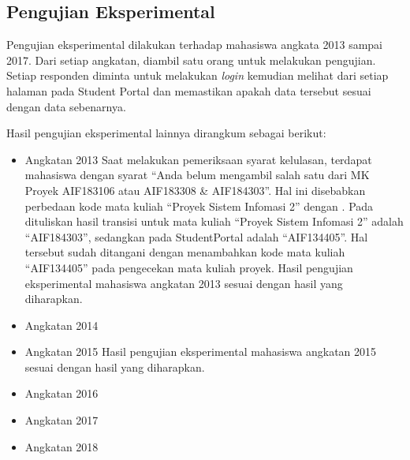 \subsection{Pengujian Eksperimental}
Pengujian eksperimental dilakukan terhadap mahasiswa angkata 2013 sampai 2017. Dari setiap angkatan, diambil satu orang untuk melakukan pengujian. Setiap responden diminta untuk melakukan \textit{login} kemudian melihat dari setiap halaman pada Student Portal dan memastikan apakah data tersebut sesuai dengan data sebenarnya.

Hasil pengujian eksperimental lainnya dirangkum sebagai berikut:
\begin{itemize}
	\item Angkatan 2013
	Saat melakukan pemeriksaan syarat kelulasan, terdapat mahasiswa dengan syarat ``Anda belum mengambil salah satu dari MK Proyek AIF183106 atau AIF183308 \& AIF184303''. Hal ini disebabkan perbedaan kode mata kuliah ``Proyek Sistem Infomasi 2'' dengan \cite{dokumenkurikulum2018}. Pada \cite{dokumenkurikulum2018} dituliskan hasil transisi untuk mata kuliah ``Proyek Sistem Infomasi 2'' adalah ``AIF184303'', sedangkan pada StudentPortal adalah ``AIF134405''. Hal tersebut sudah ditangani dengan menambahkan kode mata kuliah ``AIF134405'' pada pengecekan mata kuliah proyek. Hasil pengujian eksperimental mahasiswa angkatan 2013 sesuai dengan hasil yang diharapkan.
	\item Angkatan 2014
	
	\item Angkatan 2015
	Hasil pengujian eksperimental mahasiswa angkatan 2015 sesuai dengan hasil yang diharapkan.
	\item Angkatan 2016
	
	\item Angkatan 2017
	
	\item Angkatan 2018
	
\end{itemize}
